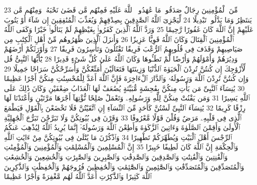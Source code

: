 {\tiny\colorbox{cl_aya}{23}} مِّنَ ٱلْمُؤْمِنِينَ رِجَالٌ صَدَقُوا۟ مَا عَٰهَدُوا۟ ٱللَّهَ عَلَيْهِ فَمِنْهُم مَّن قَضَىٰ نَحْبَهُۥ وَمِنْهُم مَّن يَنتَظِرُ وَمَا بَدَّلُوا۟ تَبْدِيلًا
{\tiny\colorbox{cl_aya}{24}} لِّيَجْزِىَ ٱللَّهُ ٱلصَّٰدِقِينَ بِصِدْقِهِمْ وَيُعَذِّبَ ٱلْمُنَٰفِقِينَ إِن شَآءَ أَوْ يَتُوبَ عَلَيْهِمْ إِنَّ ٱللَّهَ كَانَ غَفُورًا رَّحِيمًا
{\tiny\colorbox{cl_aya}{25}} وَرَدَّ ٱللَّهُ ٱلَّذِينَ كَفَرُوا۟ بِغَيْظِهِمْ لَمْ يَنَالُوا۟ خَيْرًا وَكَفَى ٱللَّهُ ٱلْمُؤْمِنِينَ ٱلْقِتَالَ وَكَانَ ٱللَّهُ قَوِيًّا عَزِيزًا
{\tiny\colorbox{cl_aya}{26}} وَأَنزَلَ ٱلَّذِينَ ظَٰهَرُوهُم مِّنْ أَهْلِ ٱلْكِتَٰبِ مِن صَيَاصِيهِمْ وَقَذَفَ فِى قُلُوبِهِمُ ٱلرُّعْبَ فَرِيقًا تَقْتُلُونَ وَتَأْسِرُونَ فَرِيقًا
{\tiny\colorbox{cl_aya}{27}} وَأَوْرَثَكُمْ أَرْضَهُمْ وَدِيَٰرَهُمْ وَأَمْوَٰلَهُمْ وَأَرْضًا لَّمْ تَطَـُٔوهَا وَكَانَ ٱللَّهُ عَلَىٰ كُلِّ شَىْءٍ قَدِيرًا
{\tiny\colorbox{cl_aya}{28}} يَٰٓأَيُّهَا ٱلنَّبِىُّ قُل لِّأَزْوَٰجِكَ إِن كُنتُنَّ تُرِدْنَ ٱلْحَيَوٰةَ ٱلدُّنْيَا وَزِينَتَهَا فَتَعَالَيْنَ أُمَتِّعْكُنَّ وَأُسَرِّحْكُنَّ سَرَاحًا جَمِيلًا
{\tiny\colorbox{cl_aya}{29}} وَإِن كُنتُنَّ تُرِدْنَ ٱللَّهَ وَرَسُولَهُۥ وَٱلدَّارَ ٱلْءَاخِرَةَ فَإِنَّ ٱللَّهَ أَعَدَّ لِلْمُحْسِنَٰتِ مِنكُنَّ أَجْرًا عَظِيمًا
{\tiny\colorbox{cl_aya}{30}} يَٰنِسَآءَ ٱلنَّبِىِّ مَن يَأْتِ مِنكُنَّ بِفَٰحِشَةٍ مُّبَيِّنَةٍ يُضَٰعَفْ لَهَا ٱلْعَذَابُ ضِعْفَيْنِ وَكَانَ ذَٰلِكَ عَلَى ٱللَّهِ يَسِيرًا
{\tiny\colorbox{cl_aya}{31}} وَمَن يَقْنُتْ مِنكُنَّ لِلَّهِ وَرَسُولِهِۦ وَتَعْمَلْ صَٰلِحًا نُّؤْتِهَآ أَجْرَهَا مَرَّتَيْنِ وَأَعْتَدْنَا لَهَا رِزْقًا كَرِيمًا
{\tiny\colorbox{cl_aya}{32}} يَٰنِسَآءَ ٱلنَّبِىِّ لَسْتُنَّ كَأَحَدٍ مِّنَ ٱلنِّسَآءِ إِنِ ٱتَّقَيْتُنَّ فَلَا تَخْضَعْنَ بِٱلْقَوْلِ فَيَطْمَعَ ٱلَّذِى فِى قَلْبِهِۦ مَرَضٌ وَقُلْنَ قَوْلًا مَّعْرُوفًا
{\tiny\colorbox{cl_aya}{33}} وَقَرْنَ فِى بُيُوتِكُنَّ وَلَا تَبَرَّجْنَ تَبَرُّجَ ٱلْجَٰهِلِيَّةِ ٱلْأُولَىٰ وَأَقِمْنَ ٱلصَّلَوٰةَ وَءَاتِينَ ٱلزَّكَوٰةَ وَأَطِعْنَ ٱللَّهَ وَرَسُولَهُۥٓ إِنَّمَا يُرِيدُ ٱللَّهُ لِيُذْهِبَ عَنكُمُ ٱلرِّجْسَ أَهْلَ ٱلْبَيْتِ وَيُطَهِّرَكُمْ تَطْهِيرًا
{\tiny\colorbox{cl_aya}{34}} وَٱذْكُرْنَ مَا يُتْلَىٰ فِى بُيُوتِكُنَّ مِنْ ءَايَٰتِ ٱللَّهِ وَٱلْحِكْمَةِ إِنَّ ٱللَّهَ كَانَ لَطِيفًا خَبِيرًا
{\tiny\colorbox{cl_aya}{35}} إِنَّ ٱلْمُسْلِمِينَ وَٱلْمُسْلِمَٰتِ وَٱلْمُؤْمِنِينَ وَٱلْمُؤْمِنَٰتِ وَٱلْقَٰنِتِينَ وَٱلْقَٰنِتَٰتِ وَٱلصَّٰدِقِينَ وَٱلصَّٰدِقَٰتِ وَٱلصَّٰبِرِينَ وَٱلصَّٰبِرَٰتِ وَٱلْخَٰشِعِينَ وَٱلْخَٰشِعَٰتِ وَٱلْمُتَصَدِّقِينَ وَٱلْمُتَصَدِّقَٰتِ وَٱلصَّٰٓئِمِينَ وَٱلصَّٰٓئِمَٰتِ وَٱلْحَٰفِظِينَ فُرُوجَهُمْ وَٱلْحَٰفِظَٰتِ وَٱلذَّٰكِرِينَ ٱللَّهَ كَثِيرًا وَٱلذَّٰكِرَٰتِ أَعَدَّ ٱللَّهُ لَهُم مَّغْفِرَةً وَأَجْرًا عَظِيمًا
